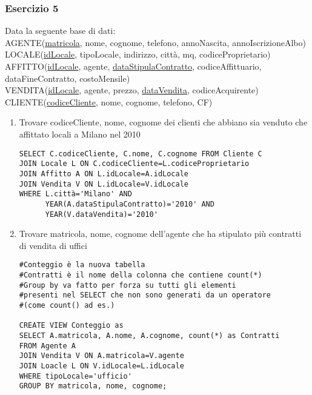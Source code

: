 \documentclass[a4paper]{article}
\begin{document}
\begin{enumerate}
\subsubsection{Esercizio 5}
Data la seguente base di dati:\medskip\\
AGENTE(\underline{matricola}, nome, cognome, telefono, annoNascita, annoIscrizioneAlbo)\\
LOCALE(\underline{idLocale}, tipoLocale, indirizzo, città, mq, codiceProprietario)\\
AFFITTO(\underline{idLocale}, agente, \underline{dataStipulaContratto}, codiceAffittuario, dataFineContratto, costoMensile)\\
VENDITA(\underline{idLocale}, agente, prezzo, \underline{dataVendita}, codiceAcquirente)\\
CLIENTE(\underline{codiceCliente}, nome, cognome, telefono, CF)\medskip
\begin{enumerate}
\item Trovare codiceCliente, nome, cognome dei clienti che abbiano sia venduto che affittato locali a Milano nel 2010
\begin{verbatim}
SELECT C.codiceCliente, C.nome, C.cognome FROM Cliente C
JOIN Locale L ON C.codiceCliente=L.codiceProprietario
JOIN Affitto A ON L.idLocale=A.idLocale
JOIN Vendita V ON L.idLocale=V.idLocale
WHERE L.città='Milano' AND
      YEAR(A.dataStipulaContratto)='2010' AND
      YEAR(V.dataVendita)='2010'
\end{verbatim}
\item Trovare matricola, nome, cognome dell'agente che ha stipulato più contratti di vendita di uffici
\begin{verbatim}
#Conteggio è la nuova tabella
#Contratti è il nome della colonna che contiene count(*)
#Group by va fatto per forza su tutti gli elementi
#presenti nel SELECT che non sono generati da un operatore
#(come count() ad es.)

CREATE VIEW Conteggio as
SELECT A.matricola, A.nome, A.cognome, count(*) as Contratti
FROM Agente A
JOIN Vendita V ON A.matricola=V.agente
JOIN Loacle L ON V.idLocale=L.idLocale
WHERE tipoLocale='ufficio'
GROUP BY matricola, nome, cognome;


\end{verbatim}
\end{enumerate}
\end{enumerate}
\end{document}
